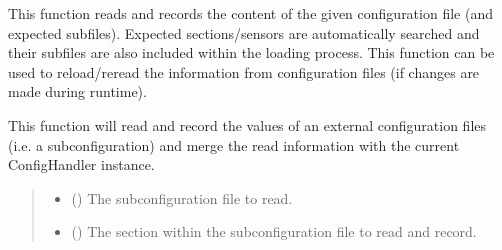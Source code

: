\documentclass[letterpaper,10pt,english]{sphinxmanual}
\begin{document}
\begin{fulllineitems}
\begin{fulllineitems}
\label{\detokenize{modules/input/config_handler:qnav.input.config_handler.ConfigHandler.load_configuration}}
\pysigstartsignatures
{}
\pysigstopsignatures
\sphinxAtStartPar
This function reads and records the content of the given configuration
file (and expected sub\sphinxhyphen{}files). Expected sections/sensors are
automatically searched and their sub\sphinxhyphen{}files are also included within
the loading process. This function can be used to re\sphinxhyphen{}load/re\sphinxhyphen{}read the
information from configuration files (if changes are made during
runtime).

\end{fulllineitems}


\begin{fulllineitems}
\label{\detokenize{modules/input/config_handler:qnav.input.config_handler.ConfigHandler.append_config}}
\pysigstartsignatures
{}
\pysigstopsignatures
\sphinxAtStartPar
This function will read and record the values of an external
configuration files (i.e. a sub\sphinxhyphen{}configuration) and merge the read
information with the current ConfigHandler instance.
\begin{quote}\begin{description}
\begin{itemize}
\item {} 
\sphinxAtStartPar
{} () \textendash{} The sub\sphinxhyphen{}configuration file to read.

\item {} 
\sphinxAtStartPar
{} () \textendash{} The section within the sub\sphinxhyphen{}configuration
file to read and record.


\end{itemize}
\end{description}
\end{quote}
\end{fulllineitems}
\end{fulllineitems}
\end{document}
